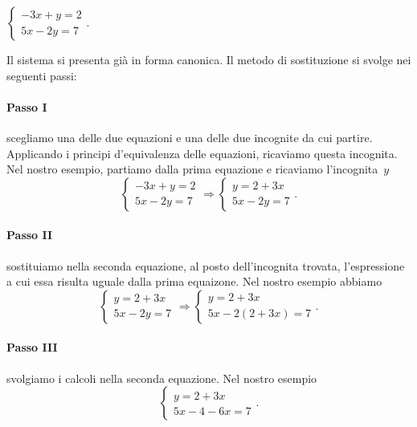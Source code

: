 \begin{exrig}
\begin{esempio}
$\left\{\begin{array}{l}-3x+y=2\\5x-2y=7\end{array}\right.$.
\end{esempio}

Il sistema si presenta già in forma canonica. Il metodo di
sostituzione si svolge nei seguenti passi:

\paragraph{Passo I} scegliamo una delle due equazioni e una
delle due incognite da cui partire. Applicando i principi
d'equivalenza delle equazioni, ricaviamo questa
incognita.
Nel nostro esempio, partiamo dalla prima equazione e ricaviamo
l'incognita~$y$
\[\left\{\begin{array}{l}
     -3x+y=2\\
     5x-2y=7
    \end{array}
\right.
\Rightarrow
\left\{\begin{array}{l}y=2+3x \\
	 5x-2y=7
\end{array}\right..\]

\paragraph{Passo II} sostituiamo nella seconda equazione, al posto
dell'incognita trovata, l'espressione
a cui essa risulta uguale dalla prima equaizone. Nel nostro esempio abbiamo
\[\left\{\begin{array}{l}
     y=2+3x\\
     5x-2y=7
    \end{array}
\right.
\Rightarrow
\left\{\begin{array}{l}y=2+3x \\
	 5x-2(2+3x)=7
\end{array}\right..\]

\paragraph{Passo III} svolgiamo i calcoli nella seconda equazione.
Nel nostro esempio
\[\left\{\begin{array}{l}y=2+3x\\
5x-4-6x=7\end{array}\right..\]


\end{exrig}
